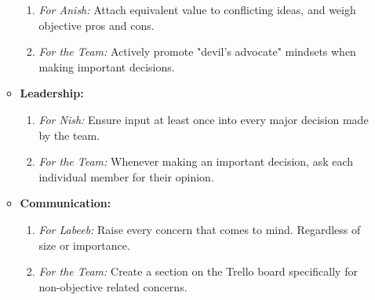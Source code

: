 \documentclass[12pt, titlepage]{article}
\begin{document}
\begin{enumerate}
\begin{itemize}
\begin{enumerate}
                  \item \textit{For Anish:} Attach equivalent value to conflicting ideas, and weigh objective pros and cons.
                  \item \textit{For the Team:} Actively promote "devil's advocate" mindsets when making important decisions.
                \end{enumerate}
          \item \textbf{Leadership:}
                \begin{enumerate}
                  \item \textit{For Nish:} Ensure input at least once into every major decision made by the team.
                  \item \textit{For the Team:} Whenever making an important decision, ask each individual member for their opinion.
                \end{enumerate}
          \item \textbf{Communication:}
                \begin{enumerate}
                  \item \textit{For Labeeb:} Raise every concern that comes to mind. Regardless of size or importance.
                  \item \textit{For the Team:} Create a section on the Trello board specifically for non-objective related concerns.
                \end{enumerate}
        \end{itemize}
\end{enumerate}
\end{document}
